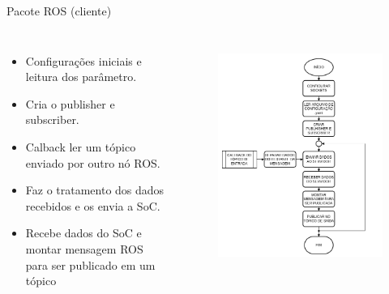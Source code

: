 \documentclass[10pt]{beamer}
\begin{document}
\begin{frame}{Pacote ROS (cliente)}
	\begin{alertblock}{}
		\begin{columns}
			\begin{itemize}
				\setlength\itemsep{0.6em}
				\item Configurações iniciais e leitura dos parâmetro.
				\item Cria o publisher e subscriber.
				\item Calback ler um tópico enviado por outro nó ROS.
				\item Faz o tratamento dos dados recebidos e os envia a SoC.
				\item Recebe dados do SoC e montar mensagem ROS para ser publicado em um tópico
			\end{itemize}
			\begin{figure}[h]
				\begin{center}
					\includegraphics[scale=0.24]{imagens/fluxogramaCliente.png}\\
				\end{center}
				\label{fig:cliente}
			\end{figure}
		\end{columns}
	\end{alertblock}
\end{frame}
\end{document}
